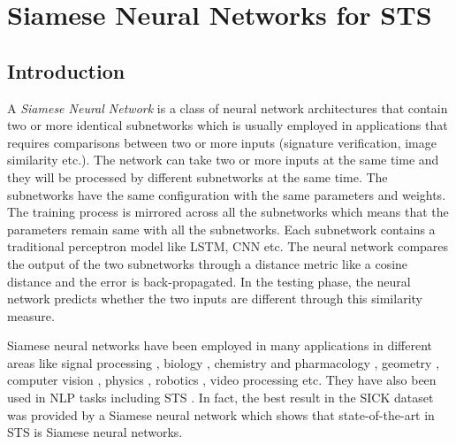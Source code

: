 \chapter{\label{cha:sts_siamese_neural_networks}Siamese Neural Networks for STS}

\section{Introduction}
A \textit{Siamese Neural Network} is a class of neural network architectures that contain two or more identical subnetworks which is usually employed in applications that requires comparisons between two or more inputs (signature verification, image similarity etc.). The network can take two or more inputs at the same time and they will be processed by different subnetworks at the same time. The subnetworks have the same configuration with the same parameters and weights. The training process is mirrored across all the subnetworks which means that the parameters remain same with all the subnetworks. Each subnetwork contains a traditional perceptron model like LSTM, CNN etc. The neural network compares the output of the two subnetworks through a distance metric like a cosine distance and the error is back-propagated. In the testing phase, the neural network predicts whether the two inputs are different through this similarity measure. 

Siamese neural networks have been employed in many applications in different areas like signal processing \cite{thiolliere2015hybrid, 8461524, 8268960, 8453811, 10.1007/978-3-319-66429-3_11, 8064706, 8268994, Zeghidour2016}, biology \cite{10.1093/bioinformatics/bty887, Szubert2019}, chemistry and pharmacology \cite{10.1093/bioinformatics/btz411}, geometry \cite{10.1093/jcde/qwaa003}, computer vision  \cite{6797067,1467314,rs10020355,21be1428c6a44fb7a32d49ba83126bcb,6976727,6636646,Taigman_2014_CVPR,7163112,8269987,HANIF201954}, physics \cite{Zou18, DEBAETS2019645}, robotics \cite{Utkin2017, 7970671, 8461044}, video processing \cite{AAAI1816790, 8036238, Liu2018, 8587153} etc. They have also been used in NLP tasks \cite{10.5555/2018936.2018965,10.1145/3209978.3210144,Gonzalez2019} including STS \cite{das-etal-2016-together, neculoiu-etal-2016-learning, Mueller_Thyagarajan_2016}. In fact, the best result in the SICK dataset \cite{marelli-etal-2014-semeval} was provided by a Siamese neural network \cite{Mueller_Thyagarajan_2016} which shows that state-of-the-art in STS is Siamese neural networks. 

